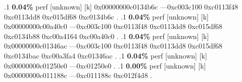 \begin{profile}
{.1 \textbf{ 0.04\%} perf             [unknown]              [k] 0x00000000c0134b6c\newline {} ---0xc003c100\newline {} 0xc0113f48\newline {} 0xc0113dd8\newline {} 0xc015df68\newline {} 0xc0134b6c\newline {} . 
.1 \textbf{ 0.04\%} perf             [unknown]              [k] 0x00000000c00a40c0\newline {} ---0xc003c100\newline {} 0xc0113f48\newline {} 0xc0113dd8\newline {} 0xc015df68\newline {} 0xc0134b88\newline {} 0xc00a4164\newline {} 0xc00a40c0\newline {} . 
.1 \textbf{ 0.04\%} perf             [unknown]              [k] 0x00000000c01346ac\newline {} ---0xc003c100\newline {} 0xc0113f48\newline {} 0xc0113dd8\newline {} 0xc015df68\newline {} 0xc0134bac\newline {} 0xc00a3fa4\newline {} 0xc01346ac\newline {} . 
.1 \textbf{ 0.04\%} perf             [unknown]              [k] 0x00000000c01250e0\newline {} ---0xc01250e0\newline {} . 
.1 \textbf{ 0.00\%} perf             [unknown]              [k] 0x00000000c011188c\newline {} ---0xc011188c\newline {} 0xc012f4d8\newline {} . 
}
\end{profile}
